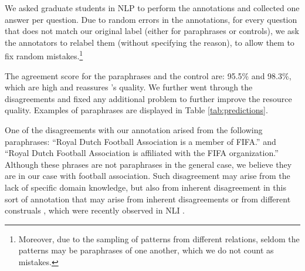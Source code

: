 We asked graduate students in NLP to perform the annotations and collected one answer per question.
Due to random errors in the annotations, for every question that does not match our original label (either for paraphrases or controls), we ask the annotators to relabel them (without specifying the reason), to allow them to fix random mistakes.\footnote{Moreover, due to the sampling of patterns from different relations, seldom the patterns may be paraphrases of one another, which we do not count as mistakes.}

The agreement score for the paraphrases and the control are: 95.5\% and 98.3\%, which are high and reassures \resource's quality.
We further went through the disagreements  %
and fixed any additional problem %
to further improve the resource quality.
Examples of paraphrases are displayed in Table \ref{tab:predictions}. 
% 

One of the disagreements with our annotation arised from the following paraphrases: ``Royal Dutch Football Association is a member of FIFA.'' and ``Royal Dutch Football Association is affiliated with the FIFA organization.''
Although these phrases are not paraphrases in the general case, we believe they are in our case with football association. Such disagreement may arise from the lack of specific domain knowledge, but also from inherent disagreement in this sort of annotation that may arise from inherent disagreements \cite{pavlick2019inherent} or from different construals \cite{trott2020re}, which were recently observed in NLI \cite{elazar2020extraordinary}.
